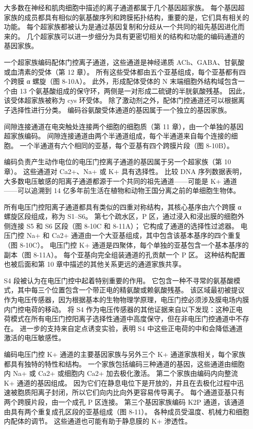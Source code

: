 大多数在神经和肌肉细胞中描述的离子通道都属于几个基因超家族。 每个基因超家族的成员都具有相似的氨基酸序列和跨膜拓扑结构，重要的是，它们具有相关的功能。 每个超家族都被认为是通过基因复制和分歧从一个共同的祖先基因进化而来的。 几个超家族可以进一步细分为具有更密切相关的结构和功能的编码通道的基因家族。

一个超家族编码配体门控离子通道，这些通道是神经递质 ACh、GABA、甘氨酸或血清素的受体（第 12 章）。 所有这些受体都由五个亚基组成，每个亚基都有四个跨膜 α 螺旋（图 8-10A）。 此外，形成配体受体的 N 末端细胞外结构域包含一个由 13 个氨基酸组成的保守环，两侧是一对形成二硫键的半胱氨酸残基。 因此，该受体超家族被称为 cys 环受体。 除了激动剂之外，配体门控通道还可以根据离子选择性进行分类。 编码谷氨酸受体通道的基因属于一个独立的基因家族。

间隙连接通道在电突触处连接两个细胞的细胞质（第 11 章），由一个单独的基因超家族编码。 间隙连接通道由两个半通道组成，每个半通道来自每个连接的细胞。 一个半通道有六个相同的亚基，每个亚基有四个跨膜片段（图 8-10B）。

编码负责产生动作电位的电压门控离子通道的基因属于另一个超家族（第 10 章）。 这些通道对 Ca2+、Na+ 或 K+ 具有选择性。 比较 DNA 序列数据表明，大多数电压敏感的阳离子通道都源于一个共同的祖先通道——可能是 K+ 通道——可以追溯到 14 亿多年前生活在植物和动物王国分离之前的单细胞生物体。

所有电压门控阳离子通道都具有类似的四重对称结构，其核心基序由六个跨膜 α 螺旋区段组成，称为 S1–S6。 第七个疏水区，P 区，通过浸入和浸出膜的细胞外侧连接 S5 和 S6 区段（图 8-10C 和 8-11A）； 它构成了通道的选择性过滤器。 电压门控 Na+ 和 Ca2+ 通道由一个大亚基组成，其中包含该基本基序的四个重复（图 8-10C）。 电压门控 K+ 通道是四聚体，每个单独的亚基包含一个基本基序的副本（图 8-11A）。 每个亚基向完全组装通道的孔贡献一个 P 区。 这种结构配置也被后面和第 10 章中描述的其他关系更远的通道家族共享。

S4 段被认为在电压门控中起着特别重要的作用。 它包含一种不寻常的氨基酸模式，其中每三个位置包含一个带正电的精氨酸或赖氨酸残基。 该区域最初被提议作为电压传感器，因为根据基本的生物物理学原理，电压门控必须涉及膜电场内膜内门控电荷的移动。 将 S4 作为电压传感器的其他证据来自以下发现：这种正电荷模式在所有电压门控阳离子选择性通道中高度保守，但在非电压门控通道中不存在。 进一步的支持来自定点诱变实验，表明 S4 中这些正电荷的中和会降低通道激活的电压敏感性。

编码电压门控 K+ 通道的主要基因家族与另外三个 K+ 通道家族相关，每个家族都具有独特的特性和结构。 一个家族包括编码三种通道的基因，这些通道由细胞内 Na+ 或 Ca2+ 或细胞内 Ca2+ 加去极化激活。 第二个家族由编码内向整流 K+ 通道的基因组成。 因为它们在静息电位下是开放的，并且在去极化过程中迅速被胞质阳离子封闭，所以它们向内比向外更容易传导离子。 每个通道亚基只有两个跨膜片段，由一个成孔 P 区连接。 第三个基因家族编码 K2P 通道，该通道由具有两个重复成孔区段的亚基组成（图 8-11）。 各种成员受温度、机械力和细胞内配体的调节。 这些通道也可能有助于静息膜的 K+ 渗透性。

